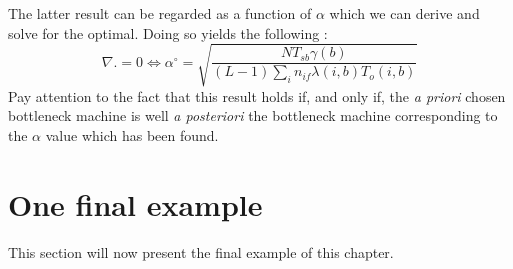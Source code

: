 The latter result can be regarded as a function of $\alpha$ which we can derive and solve for the optimal. Doing so yields the following :
\[
    \nabla. = 0 \Leftrightarrow \alpha^\circ =
    \sqrt{
        \dfrac{
            NT_{sb}\gamma(b)
        }{
            (L-1)\sum_i n_{if}\lambda(i,b)T_o(i,b)
        }
    }
\]Pay attention to the fact that this result holds if, and only if, the \textit{a priori} chosen bottleneck machine is well \textit{a posteriori} the bottleneck machine corresponding to the $\alpha$ value which has been found. 

\section{One final example}

This section will now present the final example of this chapter. 
